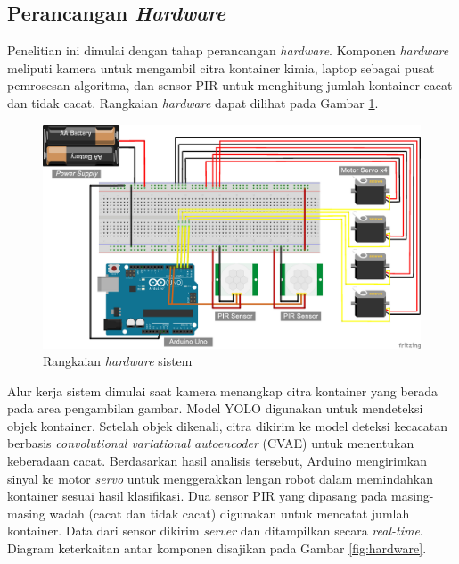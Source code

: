 \vspace{1em}

\subsection{Perancangan \textit{Hardware}}
Penelitian ini dimulai dengan tahap perancangan \textit{hardware}.
Komponen \textit{hardware} meliputi kamera untuk mengambil citra
kontainer kimia, laptop sebagai pusat pemrosesan algoritma, dan
sensor PIR untuk menghitung jumlah kontainer cacat dan tidak cacat.
Rangkaian \textit{hardware} dapat dilihat pada Gambar \ref{fig:rangkaian}.

\begin{figure}[H]
  \centering
  \includegraphics[width=\textwidth]{gambar/rangkaian.jpg}
  \caption{Rangkaian \textit{hardware} sistem}
  \label{fig:rangkaian}
\end{figure}
\vspace{-1em}

Alur kerja sistem dimulai saat kamera menangkap citra kontainer yang
berada pada area pengambilan gambar. Model YOLO digunakan untuk
mendeteksi objek kontainer. Setelah objek dikenali, citra dikirim ke
model deteksi kecacatan berbasis \textit{convolutional variational
autoencoder} (CVAE) untuk menentukan keberadaan cacat. Berdasarkan
hasil analisis tersebut, Arduino mengirimkan sinyal ke motor
\textit{servo} untuk menggerakkan lengan robot dalam memindahkan
kontainer sesuai
hasil klasifikasi. Dua sensor PIR yang dipasang pada masing-masing
wadah (cacat dan tidak cacat) digunakan untuk mencatat jumlah
kontainer. Data dari sensor dikirim \textit{server} dan ditampilkan
secara \textit{real-time}. Diagram  keterkaitan antar komponen
disajikan pada Gambar \ref{fig:hardware}.

